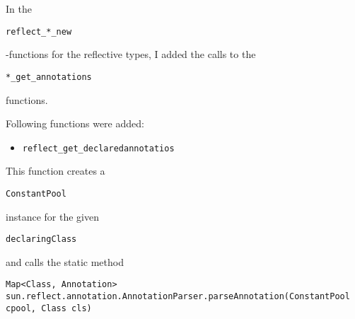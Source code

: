 \documentclass[a4paper, 10pt, titlepage]{scrartcl} %
\begin{document}
In the \begin{scriptsize}\verb|reflect_|\hspace{0.0pt}\verb|*|\hspace{0.0pt}\verb|_new|\end{scriptsize}-functions for the reflective types, I added the
calls to the \begin{scriptsize}\verb||\hspace{0.0pt}\verb|*|\hspace{0.0pt}\verb|_get_annotations|\end{scriptsize} functions.

Following functions were added:
\begin{itemize}
 \item \begin{scriptsize}\verb|reflect_get_declaredannotatios|\end{scriptsize}
\end{itemize}
This function creates a \begin{scriptsize}\verb|ConstantPool|\end{scriptsize} instance for the given
\begin{scriptsize}\verb|declaringClass|\end{scriptsize} and calls the static method
\begin{scriptsize}\verb|Map|\hspace{0.0pt}\verb|<|\hspace{0.0pt}\verb|Class|\hspace{0.0pt}\verb|,|\hspace{0.0pt}\verb||\hspace{0.0pt}\verb| |\hspace{0.0pt}\verb|Annotation|\hspace{0.0pt}\verb|>|\hspace{0.0pt}\verb||\hspace{0.0pt}\verb| |\hspace{0.0pt}\verb|sun|\hspace{0.0pt}\verb|.|\hspace{0.0pt}\verb|reflect|\hspace{0.0pt}\verb|.|\hspace{0.0pt}\verb|annotation|\hspace{0.0pt}\verb|.|\hspace{0.0pt}\verb|AnnotationParser|\hspace{0.0pt}\verb|.|\hspace{0.0pt}\verb|parseAnnotation|\hspace{0.0pt}\verb|(|\hspace{0.0pt}\verb|ConstantPool|\hspace{0.0pt}\verb| |\hspace{0.0pt}\verb|cpool|\hspace{0.0pt}\verb|,|\hspace{0.0pt}\verb||\hspace{0.0pt}\verb| |\hspace{0.0pt}\verb|Class|\hspace{0.0pt}\verb| |\hspace{0.0pt}\verb|cls|\hspace{0.0pt}\verb|)|\hspace{0.0pt}\verb||\end{scriptsize}
\end{document}
